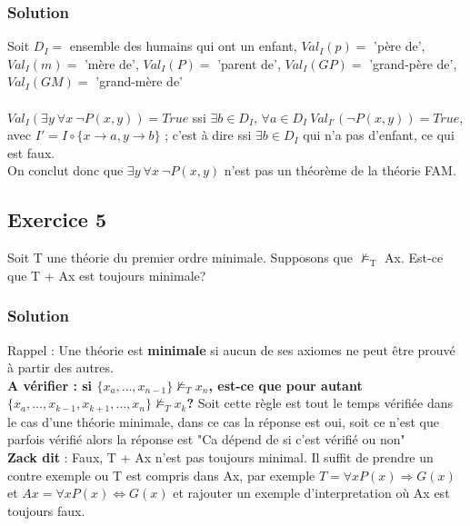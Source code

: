     \subsubsection*{Solution}
    \noindent Soit $D_I =$ ensemble des humains qui ont un enfant, $Val_I(p) = $ 'père de', $Val_I(m) = $ 'mère de', $Val_I(P) = $ 'parent de', $Val_I(GP) = $ 'grand-père de', $Val_I(GM) = $ 'grand-mère de'\\
    \\
    $Val_I (\exists y \ \forall x \ \neg P(x, y)) = True$ ssi $\exists b \in D_I$, $\forall a \in D_I \ Val_{I'}(\neg P(x, y)) = True$, avec $I' = I \circ \{x \rightarrow a, y \rightarrow b\}$ ; c'est à dire ssi $\exists b \in D_I$ qui n'a pas d'enfant, ce qui est faux.\\
    On conclut donc que $\exists y \ \forall x \ \neg P(x, y) $ n'est pas un théorème de la théorie FAM.
    

\subsection*{Exercice 5}
Soit T une th\'{e}orie du premier ordre minimale. Supposons que $\not\models_\text{T}$ Ax.
Est-ce que T + Ax est toujours minimale?


    \subsubsection*{Solution}
    Rappel : Une théorie est \textbf{minimale} si aucun de ses axiomes ne peut être prouvé à partir des autres.\\

\textbf{A vérifier : si $\{x_a,\dots ,x_{n-1}\} \not\models_{T} x_n$, est-ce que pour autant $\{x_a,\dots ,x_{k-1},x_{k+1},\dots ,x_n\} \not\models_{T} x_k$?}
Soit cette règle est tout le temps vérifiée dans le cas d'une théorie minimale, dans ce cas la réponse est oui, soit ce n'est que parfois vérifié alors la réponse est "Ca dépend de si c'est vérifié ou non"\\
\textbf{Zack dit} : Faux, T + Ax n'est pas toujours minimal. Il suffit de prendre un contre exemple ou T est compris dans Ax, par exemple $T=\forall x P(x) \Rightarrow G(x)$ et $Ax = \forall x P(x) \Leftrightarrow G(x)$ et rajouter un exemple d'interpretation où Ax est toujours faux.

